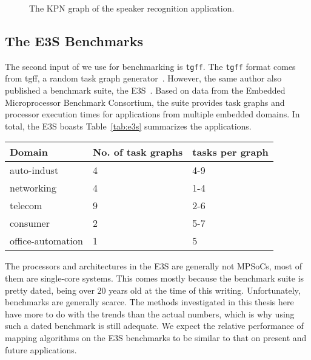 \begin{figure}[h]
	\centering
\resizebox{0.9\textwidth}{!}{
     
 }
   \caption{The \ac{KPN} graph of the speaker recognition application.}
   \label{fig:speaker_recognition}
\end{figure}

\subsection{The E3S Benchmarks}

The second input of \mocasin we use for benchmarking is \texttt{tgff}.
The \texttt{tgff} format comes from \acf{tgff}, a random task graph generator~\cite{dick1998tgff}. 
However, the same author also published a benchmark suite, the \ac{E3S}~\cite{e3s}.
Based on data from the Embedded Microprocessor Benchmark Consortium, the suite provides task graphs and processor execution times for applications from multiple embedded domains.
In total, the \ac{E3S} boasts Table~\ref{tab:e3s} summarizes the applications.

\begin{table*}[t]
  \caption{Summary of applications in the \ac{E3S}}
  \begin{center}
    \begin{tabular}{lll}
      Domain & No. of task graphs & tasks per graph\\
      \hline
      auto-indust & 4 & 4-9\\
      networking & 4 & 1-4\\
      telecom & 9 & 2-6\\
      consumer & 2 & 5-7\\
      office-automation & 1 & 5\\
    \end{tabular}
    \label{tab:e3s}
  \end{center}
  \vspace{-0.5cm}
\end{table*}

The processors and architectures in the \ac{E3S} are generally not \acp{MPSoC}, most of them are single-core systems.
This comes mostly because the benchmark suite is pretty dated, being over $20$ years old at the time of this writing.
Unfortunately, benchmarks are generally scarce.
The methods investigated in this thesis here have more to do with the trends than the actual numbers, which is why using such a dated benchmark is still adequate.
We expect the relative performance of mapping algorithms on the \ac{E3S} benchmarks to be similar to that on present and future applications.

